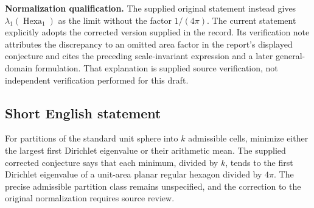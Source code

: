 \documentclass[11pt]{article}
\begin{document}
\textbf{Normalization qualification.} The supplied original statement instead gives \(\lambda_1(\operatorname{Hexa}_1)\) as the limit without the factor \(1/(4\pi)\). The current statement explicitly adopts the corrected version supplied in the record. Its verification note attributes the discrepancy to an omitted area factor in the report's displayed conjecture and cites the preceding scale-invariant expression and a later general-domain formulation. That explanation is supplied source verification, not independent verification performed for this draft.
\subsection{Short English statement}
For partitions of the standard unit sphere into \(k\) admissible cells, minimize either the largest first Dirichlet eigenvalue or their arithmetic mean. The supplied corrected conjecture says that each minimum, divided by \(k\), tends to the first Dirichlet eigenvalue of a unit-area planar regular hexagon divided by \(4\pi\). The precise admissible partition class remains unspecified, and the correction to the original normalization requires source review.
\end{document}

